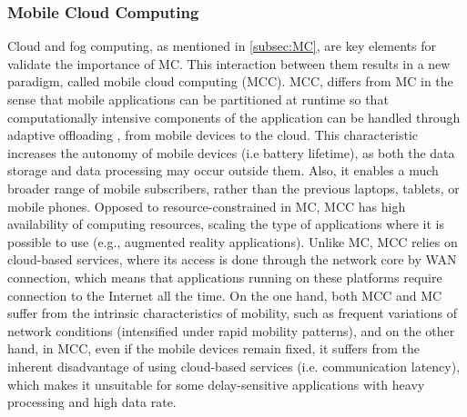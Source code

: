 \subsubsection{Mobile Cloud Computing}
Cloud and fog computing, as mentioned in \ref{subsec:MC}, are key elements for validate the importance of MC. This interaction between them results in a new paradigm, called mobile cloud computing (MCC). MCC, differs from MC in the sense that mobile applications can be partitioned at runtime so that computationally intensive components of the application can be handled through adaptive offloading \cite{shiraz2013review}, from mobile devices to the cloud. This characteristic increases the autonomy of mobile devices (i.e battery lifetime), as both the data storage and data processing may occur outside them. Also, it enables a much broader range of mobile subscribers, rather than the previous laptops, tablets, or mobile phones. Opposed to resource-constrained in MC, MCC has high availability of computing resources, scaling the type of applications where it is possible to use (e.g., augmented reality applications). Unlike MC, MCC relies on cloud-based services, where its access is done through the network core by WAN connection, which means that applications running on these platforms require connection to the Internet all the time. On the one hand, both MCC and MC suffer from the intrinsic characteristics of mobility, such as frequent variations of network conditions (intensified under rapid mobility patterns), and on the other hand, in MCC, even if the mobile devices remain fixed, it suffers from the inherent disadvantage of using cloud-based services (i.e. communication latency), which makes it unsuitable for some delay-sensitive applications with heavy processing and high data rate.

